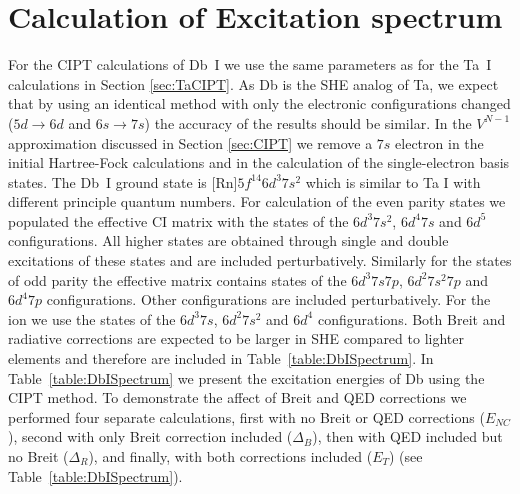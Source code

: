 \documentclass[10pt,a4paper, twoside, openright]{report}
\begin{document}
\section{Calculation of Excitation spectrum}
For the CIPT calculations of Db~I we use the same parameters as for the Ta~I calculations in Section \ref{sec:TaCIPT}. As Db is the SHE analog of Ta, we expect that by using an identical method with only the electronic configurations changed ($5d \rightarrow 6d$ and $6s \rightarrow 7s$) the accuracy of the results should be similar. In the $V^{N-1}$ approximation discussed in Section \ref{sec:CIPT} we remove a $7s$ electron in the initial Hartree-Fock calculations and in the calculation of the single-electron basis states. The Db~I ground state is [Rn]$5f^{14}6d^3 7s^2$ which is similar to Ta I with different principle quantum numbers. For calculation of the even parity states we populated the effective CI matrix with the states of the $6d^3 7s^2$,  $6d^4 7s$ and $6d^5$ configurations. All higher states are obtained through single and double excitations of these states and are included perturbatively. Similarly for  the states of odd parity the effective matrix contains states of the  $6d^3 7s 7p$, $6d^2 7s^2 7p$ and $6d^4 7p$ configurations. Other configurations are included perturbatively. For the ion  we use the states of the $6d^3 7s$, $6d^2 7s^2$ and $6d^4$ configurations.  Both Breit and radiative corrections are expected to be larger in SHE compared to lighter elements and therefore are included in Table~\ref{table:DbISpectrum}. In Table~\ref{table:DbISpectrum} we present the excitation energies of Db using the CIPT method. To demonstrate the affect of  Breit and QED corrections we performed four separate calculations,
first with no Breit or QED corrections ($E_{NC}$), second with only Breit correction included ($\Delta_{B}$), then with QED included but no Breit ($\Delta_{R}$), and finally,
with both corrections included ($E_T$) (see Table~\ref{table:DbISpectrum}).\\
\linebreak
\end{document}
